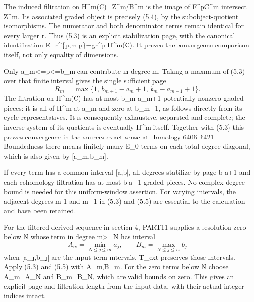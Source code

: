 \documentclass[11pt]{article}
\begin{document}
The induced filtration on H\textasciicircum{}m(C)\allowbreak{}\allowbreak{}=Z\textasciicircum{}m/\allowbreak{}B\textasciicircum{}m is the image of F\^{}pC\^{}m intersect Z\^{}m. Its associated graded object is precisely (5.4)\allowbreak{},\allowbreak{} by the subobject-quotient isomorphisms. The numerator and both denominator terms remain identical for every larger r. Thus (5.3)\allowbreak{} is an explicit stabilization page,\allowbreak{} with the canonical identification E\_\allowbreak{}r\textasciicircum{}\{p,\allowbreak{}m-p\}\allowbreak{}=gr\textasciicircum{}p H\textasciicircum{}m(C)\allowbreak{}. It proves the convergence comparison itself,\allowbreak{} not only equality of dimensions.

Only a\_\allowbreak{}m<\allowbreak{}=p<\allowbreak{}=b\_\allowbreak{}m can contribute in degree m. Taking a maximum of (5.3)\allowbreak{} over that finite interval gives the single sufficient page \[
 R_m=\max\{1,\ b_{m+1}-a_m+1,\
                   b_m-a_{m-1}+1\}.                         \tag{5.5}
\] The filtration on H\textasciicircum{}m(C)\allowbreak{} has at most b\_\allowbreak{}m-a\_\allowbreak{}m\allowbreak{}+1 potentially nonzero graded pieces:\allowbreak{} it is all of H\^{}m at a\_\allowbreak{}m and zero at b\_\allowbreak{}m\allowbreak{}+1,\allowbreak{} as follows directly from its cycle representatives. It is consequently exhaustive,\allowbreak{} separated and complete; the inverse system of its quotients is eventually H\^{}m itself. Together with (5.3)\allowbreak{} this proves convergence in the source\textquotesingle s exact sense at Homology 6406–\allowbreak{}6421. Boundedness there means finitely many E\_\allowbreak{}0 terms on each total-degree diagonal,\allowbreak{} which is also given by [a\_\allowbreak{}m,\allowbreak{}b\_\allowbreak{}m]\allowbreak{}.

If every term has a common interval [a,\allowbreak{}b]\allowbreak{},\allowbreak{} all degrees stabilize by page b-a\allowbreak{}+1 and each cohomology filtration has at most b-a\allowbreak{}+1 graded pieces. No complex-degree bound is needed for this uniform-window assertion. For varying intervals,\allowbreak{} the adjacent degrees m-1 and m\allowbreak{}+1 in (5.3)\allowbreak{} and (5.5)\allowbreak{} are essential to the calculation and have been retained.

For the filtered derived sequence in section 4,\allowbreak{} PART11 supplies a resolution zero below N whose term in degree m>\allowbreak{}=N has interval \[
 A_m=\min_{N\le j\le m}a_j,\qquad
 B_m=\max_{N\le j\le m}b_j
                                                               \tag{5.6}
\] when [a\_\allowbreak{}j,\allowbreak{}b\_\allowbreak{}j]\allowbreak{} are the input term intervals. T\_\allowbreak{}ext preserves those intervals. Apply (5.3)\allowbreak{} and (5.5)\allowbreak{} with A\_\allowbreak{}m,\allowbreak{}B\_\allowbreak{}m. For the zero terms below N choose A\_\allowbreak{}m\allowbreak{}=A\_\allowbreak{}N and B\_\allowbreak{}m\allowbreak{}=B\_\allowbreak{}N,\allowbreak{} which are valid bounds on zero. This gives an explicit page and filtration length from the input data,\allowbreak{} with their actual integer indices intact.
\end{document}
